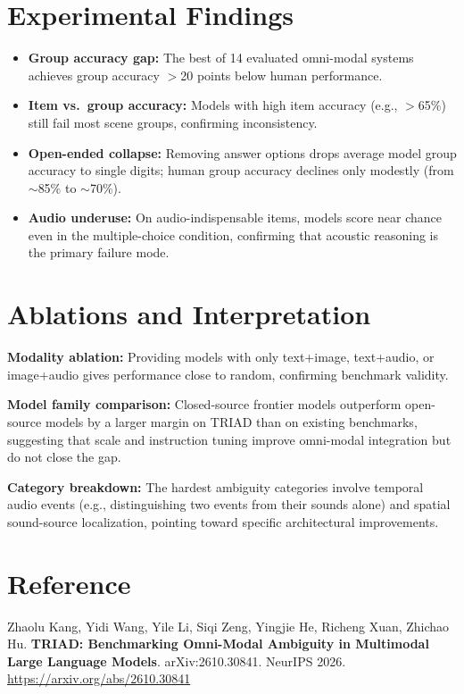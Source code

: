 \documentclass[10pt,twocolumn]{article}
\begin{document}
\section{Experimental Findings}

\begin{itemize}[itemsep=2pt,parsep=0pt]
  \item \textbf{Group accuracy gap:} The best of 14 evaluated omni-modal
    systems achieves group accuracy $>$20 points below human performance.
  \item \textbf{Item vs.\ group accuracy:} Models with high item accuracy
    (e.g., $>$65\%) still fail most scene groups, confirming inconsistency.
  \item \textbf{Open-ended collapse:} Removing answer options drops average
    model group accuracy to single digits; human group accuracy declines
    only modestly (from $\sim$85\% to $\sim$70\%).
  \item \textbf{Audio underuse:} On audio-indispensable items, models score
    near chance even in the multiple-choice condition, confirming that
    acoustic reasoning is the primary failure mode.
\end{itemize}

\section{Ablations and Interpretation}

\textbf{Modality ablation:}
Providing models with only text+image, text+audio, or image+audio gives
performance close to random, confirming benchmark validity.

\textbf{Model family comparison:}
Closed-source frontier models outperform open-source models by a
larger margin on TRIAD than on existing benchmarks, suggesting that
scale and instruction tuning improve omni-modal integration but do not
close the gap.

\textbf{Category breakdown:}
The hardest ambiguity categories involve temporal audio events (e.g.,
distinguishing two events from their sounds alone) and spatial
sound-source localization, pointing toward specific architectural
improvements.

\section*{Reference}

Zhaolu Kang, Yidi Wang, Yile Li, Siqi Zeng, Yingjie He, Richeng Xuan,
Zhichao Hu.
\textbf{TRIAD: Benchmarking Omni-Modal Ambiguity in Multimodal Large
Language Models}.
arXiv:2610.30841. NeurIPS 2026.
\url{https://arxiv.org/abs/2610.30841}
\end{document}

